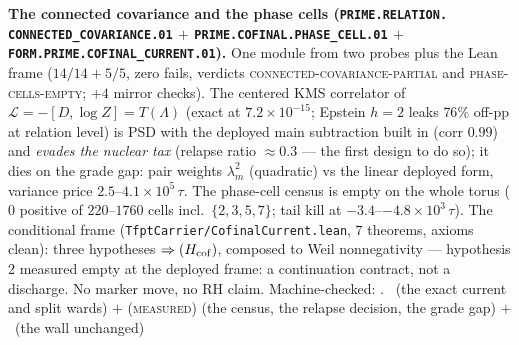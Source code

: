 \par\smallskip\noindent\textbf{The connected covariance and the
phase cells (\texttt{PRIME.RELATION.\allowbreak
CONNECTED\_COVARIANCE.01} $+$
\texttt{PRIME.COFINAL.\allowbreak PHASE\_CELL.01} $+$
\texttt{FORM.PRIME.\allowbreak COFINAL\_CURRENT.01}).}
One module from two probes plus the Lean frame ($14/14 + 5/5$,
zero fails, verdicts \textsc{connected-covariance-partial} and
\textsc{phase-cells-empty}; $+4$ mirror checks).  The centered
KMS correlator of $\mathcal{L} = -[D, \log Z] = T(\Lambda)$
(exact at $7.2\times10^{-15}$; Epstein $h{=}2$ leaks $76\%$
off-pp at relation level) is PSD with the deployed main
subtraction built in (corr $0.99$) and \emph{evades the nuclear
tax} (relapse ratio $\approx 0.3$ --- the first design to do
so); it dies on the grade gap: pair weights $\lambda_m^2$
(quadratic) vs the linear deployed form, variance price
$2.5$--$4.1\times10^5\,\tau$.  The phase-cell census is empty
on the whole torus ($0$ positive of $220$--$1760$ cells incl.\
$\{2,3,5,7\}$; tail kill at $-3.4$--$-4.8\times10^3\,\tau$).
The conditional frame
(\texttt{TfptCarrier/CofinalCurrent.lean}, $7$ theorems, axioms
clean): three hypotheses $\Rightarrow (H_{\rm cof})$, composed
to Weil nonnegativity --- hypothesis 2 measured empty at the
deployed frame: a continuation contract, not a discharge.  No
marker move, no RH claim.
Machine-checked: .
\mE\ (the exact current and split wards) $+$
(\textsc{measured}) (the census, the relapse decision, the
grade gap) $+$ \mO\ (the wall unchanged)
\par\smallskip


